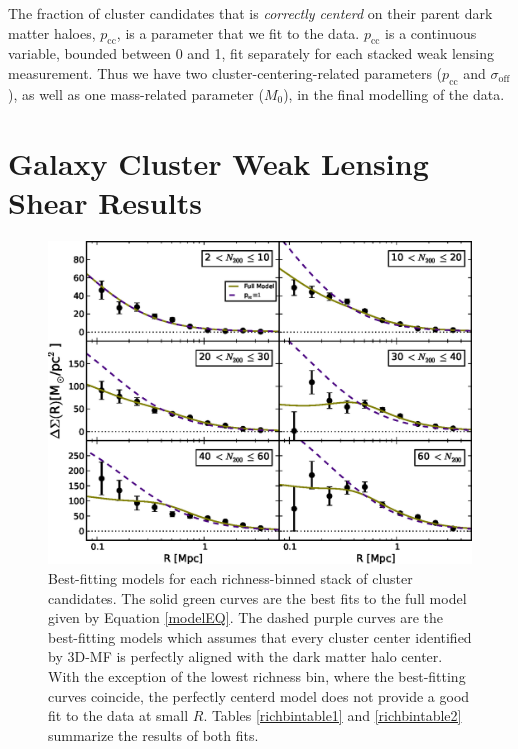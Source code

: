 The fraction of cluster candidates that is {\it correctly centerd} on their parent dark matter haloes, $p_{\mathrm{cc}}$, is a parameter that we fit to the data. $p_{\mathrm{cc}}$ is a continuous variable, bounded between 0 and 1, fit separately for each stacked weak lensing measurement. Thus we have two cluster-centering-related parameters ($p_{\mathrm{cc}}$ and $\sigma_{\mathrm{off}}$), as well as one mass-related parameter ($M_0$), in the final modelling of the data.



\section{Galaxy Cluster Weak Lensing Shear Results}
\label{sec:results}

\begin{figure}
\begin{center}
  \includegraphics[scale=0.9]{plots_ch4/shearFit_panel_fcc0and1_slopeMN1p5_DuttonMaccio.eps}
  \caption[Shear for Richness-Binned Clusters]{Best-fitting models for each richness-binned stack of cluster candidates. The solid green curves are the best fits to the full model given by Equation \ref{modelEQ}. The dashed purple curves are the best-fitting models which assumes that every cluster center identified by \ac{3D-MF} is perfectly aligned with the dark matter halo center. With the exception of the lowest richness bin, where the best-fitting curves coincide, the perfectly centerd model does not provide a good fit to the data at small $R$. Tables \ref{richbintable1} and \ref{richbintable2} summarize the results of both fits.}
\label{plot:nbinned}
\end{center}
\end{figure}

